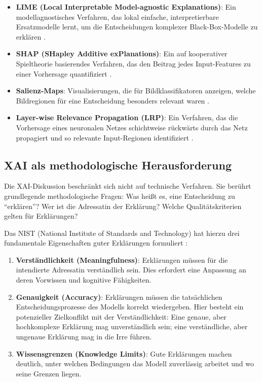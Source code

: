 \documentclass[
  12pt,
  a4paper,
  oneside,
  titlepage
]{article}
\begin{document}
\begin{itemize}
    \item \textbf{LIME (Local Interpretable Model-agnostic Explanations)}: Ein 
    modellagnostisches Verfahren, das lokal einfache, interpretierbare Ersatzmodelle 
    lernt, um die Entscheidungen komplexer Black-Box-Modelle zu erklären 
    \citep[ S.~102]{BarredoArrieta2020}.
    
    \item \textbf{SHAP (SHapley Additive exPlanations)}: Ein auf kooperativer 
    Spieltheorie basierendes Verfahren, das den Beitrag jedes Input-Features zu 
    einer Vorhersage quantifiziert \citep[ S.~104]{BarredoArrieta2020}.
    
    \item \textbf{Salienz-Maps}: Visualisierungen, die für Bildklassifikatoren 
    anzeigen, welche Bildregionen für eine Entscheidung besonders relevant waren 
    \citep{Zhou2019}.
    
    \item \textbf{Layer-wise Relevance Propagation (LRP)}: Ein Verfahren, das die 
    Vorhersage eines neuronalen Netzes schichtweise rückwärts durch das Netz 
    propagiert und so relevante Input-Regionen identifiziert \citep{Montavon2019}.
\end{itemize}

\subsection{XAI als methodologische Herausforderung}

Die XAI-Diskussion beschränkt sich nicht auf technische Verfahren. Sie berührt 
grundlegende methodologische Fragen: Was heißt es, eine Entscheidung zu 
\enquote{erklären}? Wer ist die Adressatin der Erklärung? Welche Qualitätskriterien 
gelten für Erklärungen?

Das NIST (National Institute of Standards and Technology) hat hierzu drei fundamentale 
Eigenschaften guter Erklärungen formuliert \citep[ S.~80810]{Ortigossa2024}:

\begin{enumerate}
    \item \textbf{Verständlichkeit (Meaningfulness)}: Erklärungen müssen für die 
    intendierte Adressatin verständlich sein. Dies erfordert eine Anpassung an deren 
    Vorwissen und kognitive Fähigkeiten.
    
    \item \textbf{Genauigkeit (Accuracy)}: Erklärungen müssen die tatsächlichen 
    Entscheidungsprozesse des Modells korrekt wiedergeben. Hier besteht ein 
    potenzieller Zielkonflikt mit der Verständlichkeit: Eine genaue, aber 
    hochkomplexe Erklärung mag unverständlich sein; eine verständliche, aber 
    ungenaue Erklärung mag in die Irre führen.
    
    \item \textbf{Wissensgrenzen (Knowledge Limits)}: Gute Erklärungen machen 
    deutlich, unter welchen Bedingungen das Modell zuverlässig arbeitet und wo 
    seine Grenzen liegen.
\end{enumerate}
\end{document}
